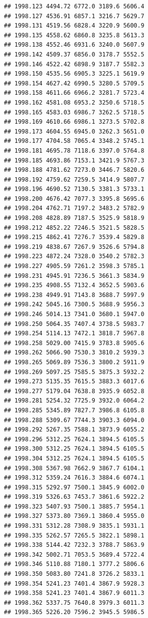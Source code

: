 \documentclass[
]{book}
\begin{document}
\begin{verbatim}
## 1998.123 4494.72 6772.0 3189.6 5606.4
## 1998.127 4536.91 6857.1 3216.7 5629.7
## 1998.131 4519.56 6828.4 3220.9 5600.9
## 1998.135 4558.62 6860.8 3235.8 5613.3
## 1998.138 4552.46 6931.6 3240.0 5607.9
## 1998.142 4509.37 6856.0 3178.7 5552.5
## 1998.146 4522.42 6898.9 3187.7 5582.3
## 1998.150 4535.56 6905.3 3225.1 5619.9
## 1998.154 4627.42 6990.5 3280.5 5709.5
## 1998.158 4611.66 6966.2 3281.7 5723.4
## 1998.162 4581.08 6953.2 3250.6 5718.5
## 1998.165 4583.03 6986.7 3262.5 5718.5
## 1998.169 4610.66 6986.1 3273.5 5702.8
## 1998.173 4604.55 6945.0 3262.3 5651.0
## 1998.177 4704.58 7065.4 3348.2 5745.1
## 1998.181 4695.78 7118.6 3397.0 5764.8
## 1998.185 4693.86 7153.1 3421.9 5767.3
## 1998.188 4781.62 7273.0 3446.7 5820.6
## 1998.192 4759.62 7259.5 3414.9 5807.7
## 1998.196 4690.52 7130.5 3381.3 5733.1
## 1998.200 4676.42 7077.3 3395.8 5695.6
## 1998.204 4762.71 7197.2 3483.2 5782.9
## 1998.208 4828.89 7187.5 3525.9 5818.9
## 1998.212 4852.22 7246.5 3521.5 5828.5
## 1998.215 4862.41 7276.7 3539.4 5829.8
## 1998.219 4838.67 7267.9 3526.6 5794.8
## 1998.223 4872.24 7328.0 3540.2 5782.3
## 1998.227 4905.59 7261.2 3598.3 5785.1
## 1998.231 4945.91 7236.5 3661.3 5834.9
## 1998.235 4908.55 7132.4 3652.5 5903.6
## 1998.238 4949.91 7143.8 3688.7 5997.9
## 1998.242 5045.16 7300.5 3688.9 5956.3
## 1998.246 5014.13 7341.0 3680.1 5947.0
## 1998.250 5064.35 7407.4 3738.5 5983.7
## 1998.254 5114.13 7472.1 3818.7 5967.8
## 1998.258 5029.00 7415.9 3783.8 5905.6
## 1998.262 5066.90 7530.3 3810.2 5939.3
## 1998.265 5069.89 7536.3 3800.2 5911.9
## 1998.269 5097.25 7585.5 3875.3 5932.2
## 1998.273 5135.35 7615.5 3883.3 6017.6
## 1998.277 5179.04 7638.8 3935.9 6052.8
## 1998.281 5254.32 7725.9 3932.0 6064.2
## 1998.285 5345.89 7827.7 3986.8 6105.8
## 1998.288 5309.67 7744.3 3903.3 6094.0
## 1998.292 5267.35 7588.1 3873.9 6055.2
## 1998.296 5312.25 7624.1 3894.5 6105.5
## 1998.300 5312.25 7624.1 3894.5 6105.5
## 1998.304 5312.25 7624.1 3894.5 6105.5
## 1998.308 5367.98 7662.9 3867.7 6104.1
## 1998.312 5359.24 7616.3 3884.6 6074.1
## 1998.315 5292.97 7500.1 3845.9 6002.0
## 1998.319 5326.63 7453.7 3861.6 5922.2
## 1998.323 5407.93 7500.1 3885.7 5954.1
## 1998.327 5373.80 7369.1 3860.4 5955.0
## 1998.331 5312.28 7308.9 3835.1 5931.1
## 1998.335 5262.57 7265.5 3822.1 5898.1
## 1998.338 5144.42 7232.3 3788.7 5863.9
## 1998.342 5002.71 7053.5 3689.4 5722.4
## 1998.346 5110.88 7180.1 3777.2 5806.6
## 1998.350 5083.80 7241.8 3726.2 5833.1
## 1998.354 5241.23 7401.4 3867.9 5928.3
## 1998.358 5241.23 7401.4 3867.9 6011.3
## 1998.362 5337.75 7640.8 3979.3 6011.3
## 1998.365 5226.20 7596.2 3945.5 5986.5

\end{verbatim}
\end{document}

